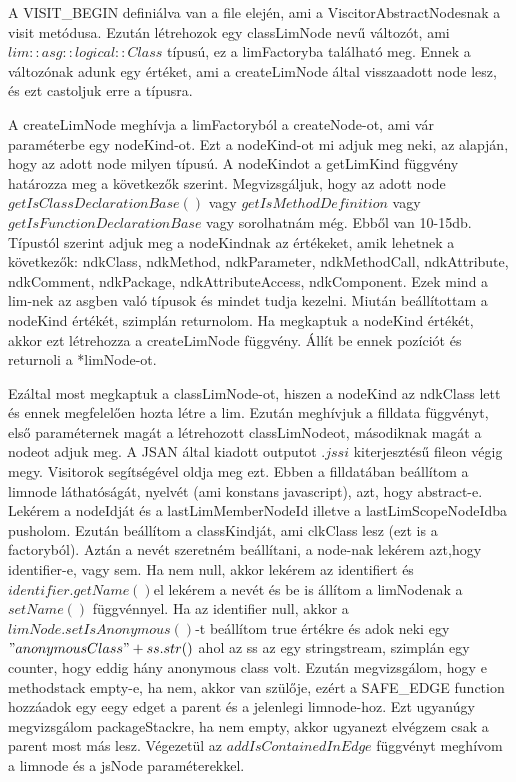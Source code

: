 A VISIT\_BEGIN definiálva van a file elején, ami a ViscitorAbstractNodesnak a visit metódusa.
Ezután létrehozok egy classLimNode nevű változót, ami ${lim::asg::logical::Class}$ típusú, ez a limFactoryba található meg.
Ennek a változónak adunk egy értéket, ami a createLimNode által visszaadott node lesz, és ezt castoljuk erre a típusra.

\noindent

A createLimNode meghívja a limFactoryból a createNode-ot, ami vár paraméterbe egy nodeKind-ot. Ezt a nodeKind-ot mi adjuk meg neki, az alapján, hogy az adott node milyen típusú.
A nodeKindot a getLimKind függvény határozza meg a következők szerint.
Megvizsgáljuk, hogy az adott node $getIsClassDeclarationBase()$ vagy $getIsMethodDefinition$ vagy $getIsFunctionDeclarationBase$ vagy sorolhatnám még. Ebből van 10-15db.
Típustól szerint adjuk meg a nodeKindnak az értékeket, amik lehetnek a következők: ndkClass, ndkMethod, ndkParameter, ndkMethodCall, ndkAttribute, ndkComment, ndkPackage, ndkAttributeAccess, ndkComponent.
Ezek mind a lim-nek az asgben való típusok és mindet tudja kezelni. Miután beállítottam a nodeKind értékét, szimplán returnolom.
Ha megkaptuk a nodeKind értékét, akkor ezt létrehozza a createLimNode függvény. Állít be ennek pozíciót és returnoli a *limNode-ot.

\noindent

Ezáltal most megkaptuk a classLimNode-ot, hiszen a nodeKind az ndkClass lett és ennek megfelelően hozta létre a lim.
Ezután meghívjuk a filldata függvényt, első paraméternek magát a létrehozott classLimNodeot, másodiknak magát a nodeot adjuk meg.
A JSAN által kiadott outputot $.jssi$ kiterjesztésű fileon végig megy. Visitorok segítségével oldja meg ezt.
Ebben a filldatában beállítom a limnode láthatóságát, nyelvét (ami konstans javascript), azt, hogy abstract-e.
Lekérem a nodeIdját és a lastLimMemberNodeId illetve a lastLimScopeNodeIdba pusholom. Ezután beállítom a classKindját, ami clkClass lesz (ezt is a factoryból).
Aztán a nevét szeretném beállítani, a node-nak lekérem azt,hogy identifier-e, vagy sem. Ha nem null, akkor lekérem az identifiert és $identifier.getName()$el lekérem a nevét és be is állítom a limNodenak a $setName()$ függvénnyel.
Ha az identifier null, akkor a $limNode.setIsAnonymous()$-t beállítom true értékre és adok neki egy $"anonymousClass"+ ss.str()$ ahol az ss az egy stringstream, szimplán egy counter, hogy eddig hány anonymous class volt.
Ezután megvizsgálom, hogy e methodstack empty-e, ha nem, akkor van szülője, ezért a SAFE\_EDGE function hozzáadok egy eegy edget a parent és a jelenlegi limnode-hoz.
Ezt ugyanúgy megvizsgálom packageStackre, ha nem empty, akkor ugyanezt elvégzem csak a parent most más lesz.
Végezetül az $addIsContainedInEdge$ függvényt meghívom a limnode és a jsNode paraméterekkel.

